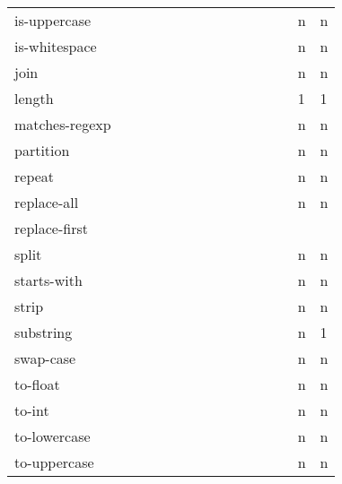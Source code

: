 \documentclass[anonymous,sigplan,review,11pt,nonacm,natbib=false]{acmart}
\begin{document}
\begin{table}
\begin{tabular}{lllllllllllllll}
            is-uppercase &  &  &  &  &  &  &  &  &  &  &  &  & n & n \\

            is-whitespace &  &  &  &  &  &  &  &  &  &  &  &  & n & n \\

            join &  &  &  &  &  &  &  &  &  &  &  &  & n & n \\

            length &  &  &  &  &  &  &  &  &  &  &  &  & 1 & 1 \\

            matches-regexp &  &  &  &  &  &  &  &  &  &  &  &  & n & n \\

            partition &  &  &  &  &  &  &  &  &  &  &  &  & n & n \\

            repeat &  &  &  &  &  &  &  &  &  &  &  &  & n & n \\

            replace-all &  &  &  &  &  &  &  &  &  &  &  &  & n & n \\

            replace-first &  &  &  &  &  &  &  &  &  &   &  &  &  & \\

            split &  &  &  &  &  &  &  &  &  &  &  &  & n & n \\

            starts-with &  &  &  &  &  &  &  &  &  &  &  &  & n & n \\

            strip &  &  &  &  &  &  &  &  &  &  &  &  & n & n \\

            substring &  &  &  &  &  &  &  &  &  &  &  &  & n & 1 \\

            swap-case &  &  &  &  &  &  &  &  &  &  &  &  & n & n \\

            to-float &  &  &  &  &  &  &  &  &  &  &  &  & n & n \\

            to-int &  &  &  &  &  &  &  &  &  &  &  &  & n & n \\

            to-lowercase &  &  &  &  &  &  &  &  &  &  &  &  & n & n \\

            to-uppercase &  &  &  &  &  &  &  &  &  &  &  &  & n & n \\


\end{tabular}
\end{table}
\end{document}
